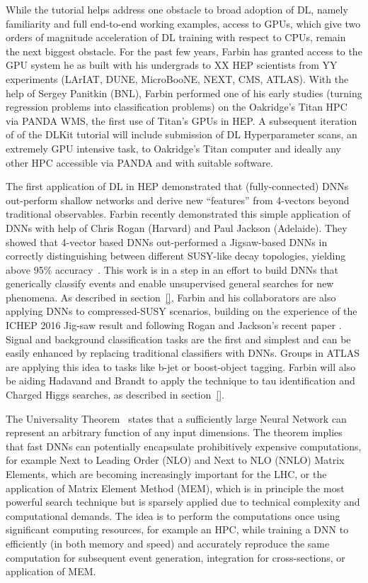 While the tutorial helps address one obstacle to broad adoption of DL,
namely familiarity and full end-to-end working examples, access to
GPUs, which give two orders of magnitude acceleration of DL training
with respect to CPUs, remain the next biggest obstacle. For the past
few years, Farbin has granted access to the GPU system he as built
with his undergrads to XX HEP scientists from YY experiments (LArIAT,
DUNE, MicroBooNE, NEXT, CMS, ATLAS). With the help of Sergey Panitkin
(BNL), Farbin performed one of his early studies (turning regression
problems into classification problems) on the Oakridge's Titan HPC via
PANDA WMS, the first use of Titan's GPUs in HEP. A subsequent
iteration of of the DLKit tutorial will include submission of DL
Hyperparameter scans, an extremely GPU intensive task, to Oakridge's
Titan computer and ideally any other HPC accessible via PANDA and with
suitable software.



The first application of DL in HEP demonstrated that (fully-connected)
DNNs out-perform shallow networks and derive new ``features'' from
4-vectors beyond traditional observables. Farbin recently demonstrated
this simple application of DNNs with help of Chris Rogan (Harvard) and
Paul Jackson (Adelaide). They showed that 4-vector based DNNs
out-performed a Jigsaw-based DNNs in correctly distinguishing between
different SUSY-like decay topologies, yielding above 95\%
accuracy~\cite{}. This work is in a step in an effort to build DNNs
that generically classify events and enable unsupervised general
searches for new phenomena. As described in section~\ref{}, Farbin and
his collaborators are also applying DNNs to compressed-SUSY scenarios,
building on the experience of the ICHEP 2016 Jig-saw result and
following Rogan and Jackson's recent paper \cite{}. Signal and
background classification tasks are the first and simplest and can be
easily enhanced by replacing traditional classifiers with DNNs. Groups
in ATLAS are applying this idea to tasks like b-jet or boost-object
tagging. Farbin will also be aiding Hadavand and Brandt to apply the
technique to tau identification and Charged Higgs searches, as
described in section~\ref{}.


The Universality Theorem~\cite{} states that a sufficiently large
Neural Network can represent an arbitrary function of any input
dimensions. The theorem implies that fast DNNs can potentially
encapsulate prohibitively expensive computations, for example Next to
Leading Order (NLO) and Next to NLO (NNLO) Matrix Elements, which are
becoming increasingly important for the LHC, or the application of
Matrix Element Method (MEM), which is in principle the most powerful
search technique but is sparsely applied due to technical complexity
and computational demands. The idea is to perform the computations
once using significant computing resources, for example an HPC, while
training a DNN to efficiently (in both memory and speed) and accurately
reproduce the same computation for subsequent event generation,
integration for cross-sections, or application of MEM.

